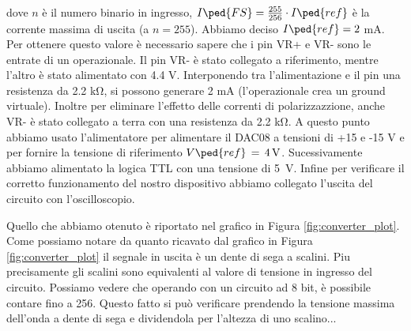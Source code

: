 dove $n$ è il numero binario in ingresso, $I\ped{FS} = \frac{255}{256} \cdot I\ped{ref}$ è la corrente massima di uscita (a $n = 255$).
Abbiamo deciso $I\ped{ref} = 2$ mA. Per ottenere questo valore è necessario sapere che i pin VR+ e VR- sono le entrate di un operazionale. Il pin VR- è stato collegato a riferimento, mentre l'altro è stato alimentato con 4.4 \si{\volt}. Interponendo tra l'alimentazione e il pin una resistenza da 2.2 \si{\kilo\ohm}, si possono generare 2 \si{\milli\ampere} (l'operazionale crea un ground virtuale). Inoltre per eliminare l'effetto delle correnti di polarizzazzione, anche VR- è stato collegato a terra con una resistenza da 2.2 \si{\kilo\ohm}.
A questo punto abbiamo usato l'alimentatore per alimentare il DAC08 a tensioni di +15 e -15 \si{\volt} e per fornire la tensione di riferimento $V\ped{ref}\,=\,\SI{+4}{\volt}$. Sucessivamente abbiamo alimentato la logica TTL con una tensione di \SI{+5}{\volt}.
Infine per verificare il corretto funzionamento del nostro dispositivo abbiamo collegato l'uscita del circuito con l'oscilloscopio.

Quello che abbiamo otenuto è riportato nel grafico in Figura \ref{fig:converter_plot}. Come possiamo notare da quanto ricavato dal grafico in Figura \ref{fig:converter_plot} il segnale in uscita è un dente di sega a scalini. Piu precisamente gli scalini sono equivalenti al valore di tensione in ingresso del circuito. Possiamo vedere che operando con un circuito ad 8 bit, è possibile contare fino a 256. Questo fatto si può verificare prendendo la tensione massima dell'onda a dente di sega e dividendola per l'altezza di uno scalino...

